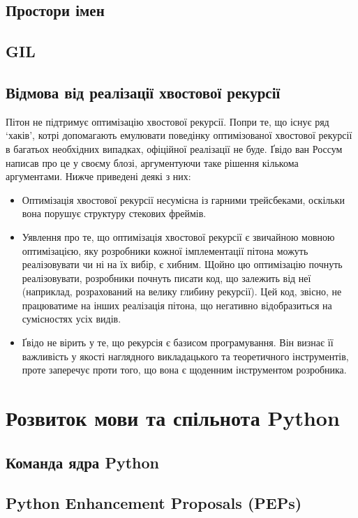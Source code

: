 \documentclass[a4paper, 12pt]{article}
\begin{document}
\subsection{Простори імен}

\subsection{GIL}

\subsection{Відмова від реалізації хвостової рекурсії}
Пітон не підтримує оптимізацію хвостової рекурсії. Попри те, що існує ряд `хаків', котрі
допомагають емулювати поведінку оптимізованої хвостової рекурсії в багатьох необхідних
випадках, офіційної реалізації не буде. Ґвідо ван Россум написав про це у своєму блозі,
аргументуючи таке рішення кількома аргументами. Нижче приведені деякі з них:
 \begin{itemize}
    \item Оптимізація хвостової рекурсії несумісна із гарними трейсбеками, оскільки вона
    порушує структуру стекових фреймів.
    \item Уявлення про те, що оптимізація хвостової рекурсії є звичайною мовною 
    оптимізацією, яку розробники кожної імплементації пітона можуть реалізовувати чи ні на 
    їх вибір, є хибним. Щойно цю оптимізацію почнуть реалізовувати, розробники почнуть 
    писати код, що залежить від неї (наприклад, розрахований на велику глибину рекурсії). 
    Цей код, звісно, не працюватиме на інших реалізація пітона, що негативно відобразиться 
    на сумісностях усіх видів.
    \item Ґвідо не вірить у те, що рекурсія є базисом програмування. Він визнає її 
    важливість у якості наглядного викладацького та теоретичного інструментів, проте 
    заперечує проти того, що вона є щоденним інструментом розробника.
 \end{itemize}


\section{Розвиток мови та спільнота Python}

\subsection{Команда ядра Python}

\subsection{Python Enhancement Proposals (PEPs)}
\end{document}
